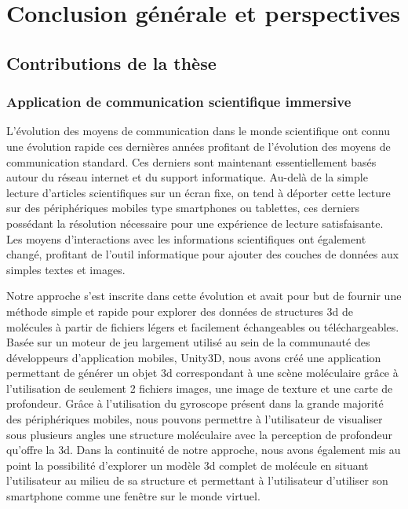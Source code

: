 


\chapter*{Conclusion générale et perspectives}
\mtcaddchapter

\mtcaddpart




\section*{Contributions de la thèse}


\subsection*{Application de communication scientifique immersive}

L'évolution des moyens de communication dans le monde scientifique ont connu une évolution rapide ces dernières années profitant de l'évolution des moyens de communication standard. Ces derniers sont maintenant essentiellement basés autour du réseau internet et du support informatique. Au-delà de la simple lecture d'articles scientifiques sur un écran fixe, on tend à déporter cette lecture sur des périphériques mobiles type smartphones ou tablettes, ces derniers possédant la résolution nécessaire pour une expérience de lecture satisfaisante. Les moyens d'interactions avec les informations scientifiques ont également changé, profitant de l'outil informatique pour ajouter des couches de données aux simples textes et images.

Notre approche s'est inscrite dans cette évolution et avait pour but de fournir une méthode simple et rapide pour explorer des données de structures 3d de molécules à partir de fichiers légers et facilement échangeables ou téléchargeables. Basée sur un moteur de jeu largement utilisé au sein de la communauté des développeurs d'application mobiles, Unity3D, nous avons créé une application permettant de générer un objet 3d correspondant à une scène moléculaire grâce à l'utilisation de seulement 2 fichiers images, une image de texture et une carte de profondeur. Grâce à l'utilisation du gyroscope présent dans la grande majorité des périphériques mobiles, nous pouvons permettre à l'utilisateur de visualiser sous plusieurs angles une structure moléculaire avec la perception de profondeur qu'offre la 3d.
Dans la continuité de notre approche, nous avons également mis au point la possibilité d'explorer un modèle 3d complet de molécule en situant l'utilisateur au milieu de sa structure et permettant à l'utilisateur d'utiliser son smartphone comme une fenêtre sur le monde virtuel.

